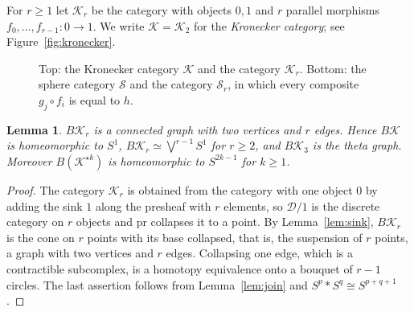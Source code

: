 \documentclass[12pt]{amsart}
\newtheorem{lemma}[teo]{Lemma}
\theoremstyle{definition}
\theoremstyle{remark}
\newcommand{\DD}{\mathcal{D}}
\newcommand{\co}{\colon}
\newcommand{\K}{\mathcal{K}}
\newcommand{\Sph}{\mathcal{S}}
\begin{document}
For $r\ge1$ let $\K_r$ be the category with objects $0,1$ and $r$ parallel morphisms $f_0,\dots,f_{r-1}\co0\to1$. We write $\K=\K_2$ for the \emph{Kronecker category}; see Figure~\ref{fig:kronecker}.

\begin{figure}[ht]
\centering
{}
\qquad\qquad
{}

\medskip
{}
\qquad\qquad
{}
\caption{Top: the Kronecker category $\K$ and the category $\K_r$. Bottom: the sphere category $\Sph$ and the category $\Sph_r$, in which every composite $g_j\circ f_i$ is equal to $h$.}
\label{fig:kronecker}\label{fig:theta}
\end{figure}

\begin{lemma}\label{lem:kronecker}
$B\K_r$ is a connected graph with two vertices and $r$ edges. Hence $B\K$ is homeomorphic to $S^1$, $B\K_r\simeq\bigvee^{r-1}S^1$ for $r\ge2$, and $B\K_3$ is the theta graph. Moreover $B(\K^{\star k})$ is homeomorphic to $S^{2k-1}$ for $k\ge1$.
\end{lemma}

\begin{proof}
The category $\K_r$ is obtained from the category with one object $0$ by adding the sink $1$ along the presheaf with $r$ elements, so $\DD/1$ is the discrete category on $r$ objects and $\mathrm{pr}$ collapses it to a point. By Lemma~\ref{lem:sink}, $B\K_r$ is the cone on $r$ points with its base collapsed, that is, the suspension of $r$ points, a graph with two vertices and $r$ edges. Collapsing one edge, which is a contractible subcomplex, is a homotopy equivalence onto a bouquet of $r-1$ circles. The last assertion follows from Lemma~\ref{lem:join} and $S^p*S^q\cong S^{p+q+1}$.
\end{proof}
\end{document}
